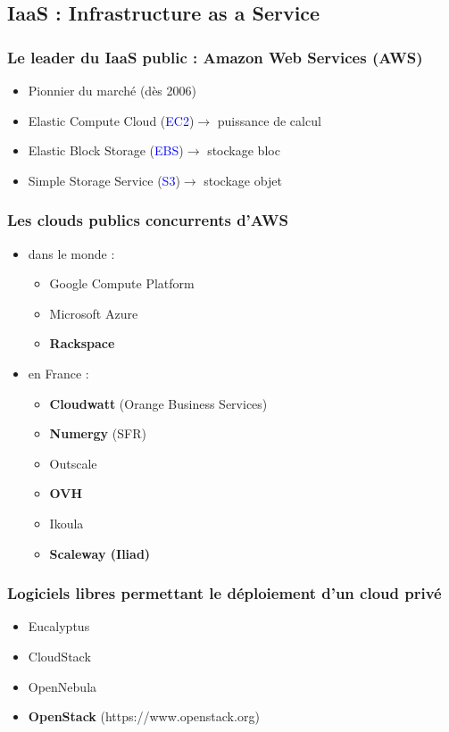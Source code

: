   \subsection[IaaS]{IaaS : Infrastructure as a Service}

  \begin{frame}
    \frametitle{Le leader du IaaS public : Amazon Web Services (AWS)}
    \begin{itemize}
      \item Pionnier du marché (dès 2006)
      \pause
      \item Elastic Compute Cloud (\textcolor{blue}{EC2})\pause $\rightarrow$ puissance de calcul
      \pause
      \item Elastic Block Storage (\textcolor{blue}{EBS})\pause $\rightarrow$ stockage bloc
      \pause
      \item Simple Storage Service (\textcolor{blue}{S3})\pause $\rightarrow$ stockage objet
    \end{itemize}
  \end{frame}

  \begin{frame}
    \frametitle{Les clouds publics concurrents d'AWS}
    \begin{itemize}
      \item dans le monde :
      \begin{itemize}
        \item Google Compute Platform
        \item Microsoft Azure
        \item \textbf<3->{Rackspace}
      \end{itemize}\pause
      \item en France :
      \begin{itemize}
        \item \textbf<3->{Cloudwatt} (Orange Business Services)
        \item \textbf<3->{Numergy} (SFR)
        \item Outscale
        \item \textbf<3->{OVH}
        \item Ikoula
        \item \textbf<3->{Scaleway (Iliad)}
      \end{itemize}
    \end{itemize}
  \end{frame}

  \begin{frame}
    \frametitle{Logiciels libres permettant le déploiement d'un cloud privé}
    \begin{itemize}
        \item Eucalyptus\pause
        \item CloudStack\pause
        \item OpenNebula\pause
        \item \textbf{OpenStack} (https://www.openstack.org)
    \end{itemize}
  \end{frame}

